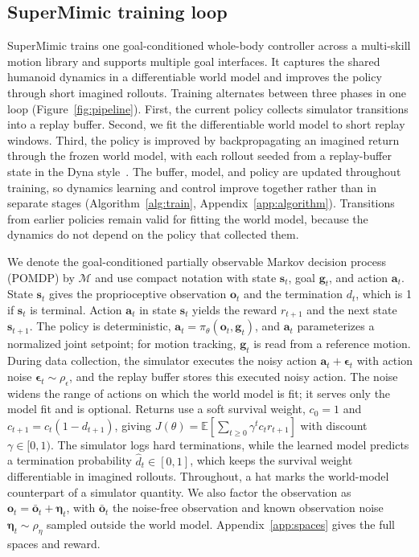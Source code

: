 \subsection{SuperMimic training loop}
\label{sec:problem}
SuperMimic trains one goal-conditioned whole-body controller across a multi-skill motion library and supports multiple goal interfaces. It captures the shared humanoid dynamics in a differentiable world model and improves the policy through short imagined rollouts. Training alternates between three phases in one loop (Figure~\ref{fig:pipeline}). First, the current policy collects simulator transitions into a replay buffer. Second, we fit the differentiable world model to short replay windows. Third, the policy is improved by backpropagating an imagined return through the frozen world model, with each rollout seeded from a replay-buffer state in the Dyna style~\citep{sutton1991dyna, janner2019trust}. The buffer, model, and policy are updated throughout training, so dynamics learning and control improve together rather than in separate stages (Algorithm~\ref{alg:train}, Appendix~\ref{app:algorithm}). Transitions from earlier policies remain valid for fitting the world model, because the dynamics do not depend on the policy that collected them.

We denote the goal-conditioned partially observable Markov decision process (POMDP) by $\mathcal{M}$ and use compact notation with state $\bm{s}_t$, goal $\bm{g}_t$, and action $\bm{a}_t$. State $\bm{s}_t$ gives the proprioceptive observation $\bm{o}_t$ and the termination $d_t$, which is 1 if $\bm{s}_t$ is terminal. Action $\bm{a}_t$ in state $\bm{s}_t$ yields the reward $r_{t+1}$ and the next state $\bm{s}_{t+1}$. The policy is deterministic, $\bm{a}_t=\pi_\theta(\bm{o}_t,\bm{g}_t)$, and $\bm{a}_t$ parameterizes a normalized joint setpoint; for motion tracking, $\bm{g}_t$ is read from a reference motion. During data collection, the simulator executes the noisy action $\bm{a}_t+\bm{\epsilon}_t$ with action noise $\bm{\epsilon}_t\sim\rho_\epsilon$, and the replay buffer stores this executed noisy action. The noise widens the range of actions on which the world model is fit; it serves only the model fit and is optional. Returns use a soft survival weight, $c_0=1$ and $c_{t+1}=c_t(1-d_{t+1})$, giving $J(\theta)=\mathbb{E}[\sum_{t\ge0}\gamma^t c_t r_{t+1}]$ with discount $\gamma\in[0,1)$. The simulator logs hard terminations, while the learned model predicts a termination probability $\hat{d}_t\in[0,1]$, which keeps the survival weight differentiable in imagined rollouts. Throughout, a hat marks the world-model counterpart of a simulator quantity. We also factor the observation as $\bm{o}_t=\bar{\bm{o}}_t+\bm{\eta}_t$, with $\bar{\bm{o}}_t$ the noise-free observation and known observation noise $\bm{\eta}_t\sim\rho_\eta$ sampled outside the world model. Appendix~\ref{app:spaces} gives the full spaces and reward.


